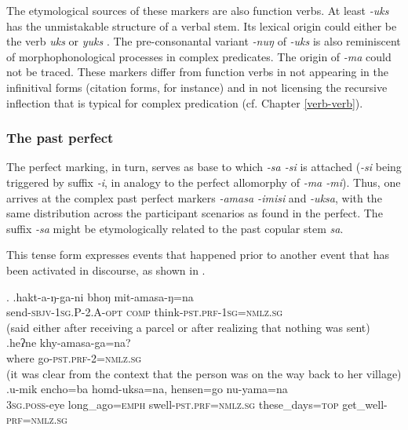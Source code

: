 The etymological sources of these markers are also function verbs. At least \emph{-uks} has the unmistakable structure of a verbal stem. Its lexical origin could either be the verb \emph{uks}  or \emph{yuks} . The pre-consonantal variant \emph{-nuŋ} of \emph{-uks} is also reminiscent of morphophonological processes in complex predicates. The origin of \emph{-ma} could not be traced. These markers differ from function verbs   in not appearing in the infinitival forms (citation forms, for instance) and in not licensing the recursive inflection that is typical for complex predication (cf. Chapter \ref{verb-verb}). 

	
\subsubsection{The past perfect}\label{pstprf}
	
The perfect marking, in turn, serves as base to which \emph{-sa \ti -si} is attached (\emph{-si} being triggered by suffix \emph{-i}, in analogy to the perfect allomorphy of \emph{-ma \ti -mi}). Thus, one arrives at the complex past perfect markers \emph{-amasa \ti -imisi} and  \emph{-uksa}, with the same distribution across the participant scenarios as found in the perfect. The suffix \emph{-sa} might be etymologically related to the past copular stem \emph{sa}. 

This tense form expresses events that happened prior to another event that has been activated in discourse, as shown in \Next.

\ex. \ag.hakt-a-ŋ-ga-ni bhoŋ mit-amasa-ŋ=na\\
send{\scshape -sbjv-1sg.P-2.A-opt} {\scshape comp} think{\scshape -pst.prf-1sg=nmlz.sg}\\
 (said either after receiving a parcel or after realizing that nothing was sent)
\bg.heʔne khy-amasa-ga=na?\\
where go{\scshape -pst.prf-2=nmlz.sg}\\
 (it was clear from the context that the person was on the way back to her village) 
	\bg.u-mik encho=ba homd-uksa=na, hensen=go nu-yama=na\\
		{\scshape 3sg.poss-}eye long\_ago{\scshape =emph} swell{\scshape -pst.prf=nmlz.sg} these\_days{\scshape =top} get\_well{\scshape -prf=nmlz.sg}\\
		
